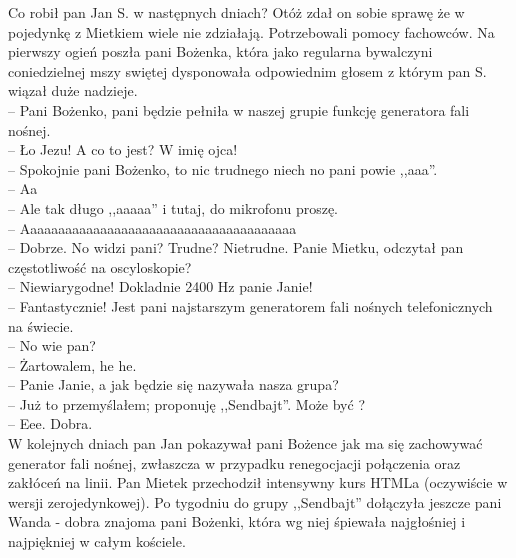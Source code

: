 \documentclass[a4paper,polish,titlepage,12pt]{article}
\begin{document}
Co robił pan Jan S. w następnych dniach? Otóż zdał on sobie sprawę że w pojedynkę z Mietkiem wiele nie zdziałają. Potrzebowali pomocy fachowców. Na pierwszy ogień poszła
pani Bożenka, która jako regularna bywalczyni coniedzielnej mszy swiętej dysponowała odpowiednim głosem z którym pan S. wiązał duże nadzieje.\\
-- Pani Bożenko, pani będzie pełniła w naszej grupie funkcję generatora fali nośnej.\\
-- Ło Jezu! A co to jest? W imię ojca!\\
-- Spokojnie pani Bożenko, to nic trudnego niech no pani powie ,,aaa''.\\
-- Aa\\
-- Ale tak długo ,,aaaaa'' i tutaj, do mikrofonu proszę.\\
-- Aaaaaaaaaaaaaaaaaaaaaaaaaaaaaaaaaaaaaaa\\
-- Dobrze. No widzi pani? Trudne? Nietrudne. Panie Mietku, odczytał pan częstotliwość na oscyloskopie?\\
-- Niewiarygodne! Dokladnie 2400 Hz panie Janie!\\
-- Fantastycznie! Jest pani najstarszym generatorem fali nośnych telefonicznych na świecie.\\
-- No wie pan?\\
-- Żartowalem, he he.\\
-- Panie Janie, a jak będzie się nazywała nasza grupa?\\
-- Już to przemyślałem; proponuję ,,Sendbajt''. Może być ?\\
-- Eee. Dobra.\\

W kolejnych dniach pan Jan pokazywał pani Bożence jak ma się zachowywać generator fali nośnej, zwłaszcza w przypadku renegocjacji połączenia oraz
zakłóceń na linii. Pan Mietek przechodził intensywny kurs HTMLa (oczywiście w wersji zerojedynkowej). Po tygodniu do grupy ,,Sendbajt'' dołączyła
jeszcze pani Wanda - dobra znajoma pani Bożenki, która wg niej śpiewała najgłośniej i najpiękniej w całym kościele.
\end{document}
